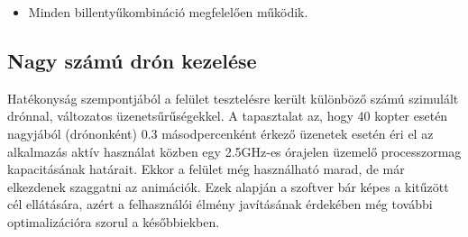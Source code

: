 \begin{itemize}

  \item Minden billentyűkombináció megfelelően működik.

\end{itemize}


\subsection{Nagy számú drón kezelése}

Hatékonyság szempontjából a felület tesztelésre került különböző számú szimulált
drónnal, változatos üzenetsűrűségekkel. A tapasztalat az, hogy 40 kopter esetén
nagyjából (drónonként) 0.3 másodpercenként érkező üzenetek esetén éri el az
alkalmazás aktív használat közben egy 2.5GHz-es órajelen üzemelő processzormag
kapacitásának határait. Ekkor a felület még használható marad, de már elkezdenek
szaggatni az animációk. Ezek alapján a szoftver bár képes a kitűzött cél
ellátására, azért a felhasználói élmény javításának érdekében még további
optimalizációra szorul a későbbiekben.
